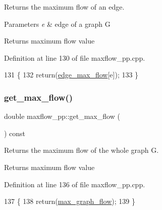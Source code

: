 Returns the maximum flow of an edge.


\begin{DoxyParams}{Parameters}
{\em e} & edge of a graph {\ttfamily G} \\
\hline
\end{DoxyParams}
\begin{DoxyReturn}{Returns}
maximum flow value 
\end{DoxyReturn}


Definition at line 130 of file maxflow\+\_\+pp.\+cpp.


\begin{DoxyCode}
131 \{
132     \textcolor{keywordflow}{return}(\mbox{\hyperlink{classmaxflow__pp_a25d5bb2ab6c775a634dacf408ff55a83}{edge\_max\_flow}}[e]);
133 \}
\end{DoxyCode}
\mbox{\label{classmaxflow__pp_a72210f8ac7aeca0a58e7407681003083}} 
\subsubsection{\texorpdfstring{get\+\_\+max\+\_\+flow()}{get\_max\_flow()}\hspace{0.1cm}{\footnotesize\ttfamily [2/2]}}
{\footnotesize\ttfamily double maxflow\+\_\+pp\+::get\+\_\+max\+\_\+flow (\begin{DoxyParamCaption}{ }\end{DoxyParamCaption}) const}

Returns the maximum flow of the whole graph {\ttfamily G}.

\begin{DoxyReturn}{Returns}
maximum flow value 
\end{DoxyReturn}


Definition at line 136 of file maxflow\+\_\+pp.\+cpp.


\begin{DoxyCode}
137 \{
138     \textcolor{keywordflow}{return}(\mbox{\hyperlink{classmaxflow__pp_abdda1871e70fd2de0f2006eff57dc94e}{max\_graph\_flow}});
139 \}
\end{DoxyCode}
\mbox{\label{classmaxflow__pp_ab3af0c0568ff2c8295166bfd75736169}} 
